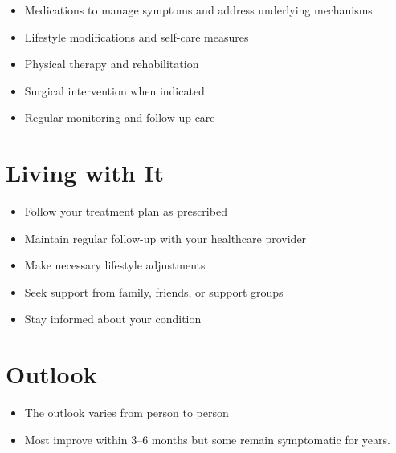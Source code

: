 \begin{itemize}[noitemsep]
  \item Medications to manage symptoms and address underlying mechanisms
  \item Lifestyle modifications and self-care measures
  \item Physical therapy and rehabilitation
  \item Surgical intervention when indicated
  \item Regular monitoring and follow-up care
\end{itemize}
\section{Living with It}
\begin{itemize}[noitemsep]
  \item Follow your treatment plan as prescribed
  \item Maintain regular follow-up with your healthcare provider
  \item Make necessary lifestyle adjustments
  \item Seek support from family, friends, or support groups
  \item Stay informed about your condition
\end{itemize}
\section{Outlook}
\begin{itemize}[noitemsep]
  \item The outlook varies from person to person
  \item Most improve within 3--6 months but some remain symptomatic for years.
\end{itemize}
